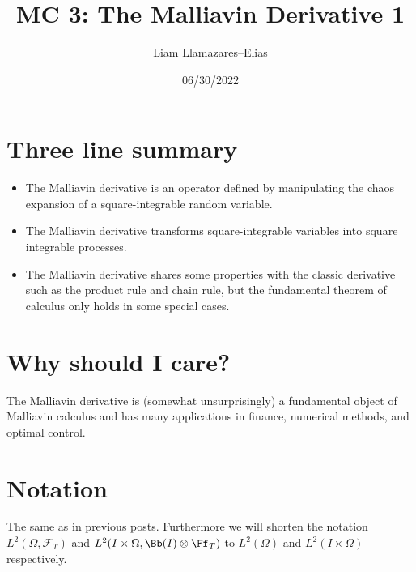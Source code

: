 \documentclass[
    a4paper,
    DIV=14,
    abstract=true,
    numbers=noenddot
]{scrartcl}
\begin{document}
\title{MC 3: The Malliavin Derivative 1}
\author{Liam Llamazares--Elias}
\date{06/30/2022}
\maketitle
\section{Three line summary}
\begin{itemize}
	\item The Malliavin derivative is an operator defined by manipulating the chaos expansion of a square-integrable random variable.
	\item The Malliavin derivative transforms square-integrable variables into square integrable processes.
	\item The Malliavin derivative shares some properties with the classic derivative such as the product rule and chain rule, but the fundamental theorem of calculus only holds in some special cases.
\end{itemize}
\section{Why should I care?}
The Malliavin derivative is  (somewhat unsurprisingly) a fundamental object of Malliavin calculus and has many applications in finance, numerical methods, and optimal control.
\section{Notation}
The same as in previous posts. Furthermore we will shorten the notation  $L^2(\Omega,\mathcal{F}_T)$ and $L^2(I\times\Omega,\Bb(I)\otimes \Ff_T)$ to $L^2(\Omega)$ and $L^2(I\times\Omega)$ respectively.
\end{document}
